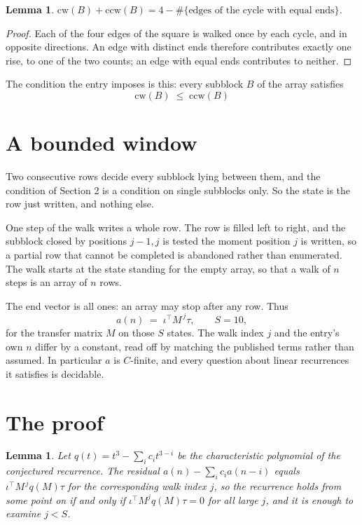\documentclass[11pt,a4paper]{article}
\theoremstyle{plain}
\newtheorem{lemma}[theorem]{Lemma}
\theoremstyle{definition}
\begin{document}
\begin{lemma}\label{lem:sum}
$\mathrm{cw}(B)+\mathrm{ccw}(B)=4-\#\{\text{edges of the cycle with equal ends}\}$.
\end{lemma}

\begin{proof}
Each of the four edges of the square is walked once by each cycle, and in opposite directions.
An edge with distinct ends therefore contributes exactly one rise, to one of the two counts;
an edge with equal ends contributes to neither.
\end{proof}

The condition the entry imposes is this: every subblock $B$ of the array satisfies
\[
\mathrm{cw}(B)\;\le\;\mathrm{ccw}(B)
\]


\section{A bounded window}

Two consecutive rows decide every subblock lying between them, and the condition of Section 2 is a condition on single subblocks only. So the state is the row just written, and nothing else.

One step of the walk writes a whole row. The row is filled left to right, and the subblock
closed by positions $j-1,j$ is tested the moment position $j$ is written, so a partial row that
cannot be completed is abandoned rather than enumerated. The walk starts at the state standing
for the empty array, so that a walk of $n$ steps is an array of $n$ rows.

The end vector is all ones: an array may stop after any row. Thus
\[
a(n)\;=\;\iota^{\!\top}M^{\,j}\tau ,\qquad S=10,
\]
for the transfer matrix $M$ on those $S$ states. The walk index $j$ and the entry's own $n$
differ by a constant, read off by matching the published terms rather than assumed. In
particular $a$ is $C$-finite, and every question about linear recurrences it satisfies is
decidable.

\section{The proof}

\begin{lemma}\label{lem:crit}
Let $q(t)=t^{3}-\sum_i c_it^{3-i}$ be the characteristic polynomial of the
conjectured recurrence. The residual $a(n)-\sum_ic_ia(n-i)$ equals
$\iota^{\!\top}M^{\,j}q(M)\tau$ for the corresponding walk index $j$, so the recurrence
holds from some point on if and only if $\iota^{\!\top}M^{j}q(M)\tau=0$ for all large $j$,
and it is enough to examine $j<S$.
\end{lemma}
\end{document}
